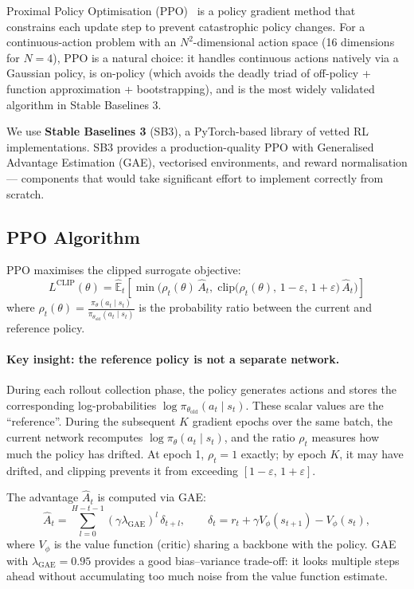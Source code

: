 \documentclass[11pt]{article}
\begin{document}
Proximal Policy Optimisation (PPO)~\cite{schulman2017ppo} is a policy gradient method that constrains each update step to prevent catastrophic policy changes. For a continuous-action problem with an $N^2$-dimensional action space (16 dimensions for $N=4$), PPO is a natural choice: it handles continuous actions natively via a Gaussian policy, is on-policy (which avoids the deadly triad of off-policy + function approximation + bootstrapping), and is the most widely validated algorithm in Stable Baselines 3.

We use \textbf{Stable Baselines 3} (SB3), a PyTorch-based library of vetted RL implementations. SB3 provides a production-quality PPO with Generalised Advantage Estimation (GAE), vectorised environments, and reward normalisation — components that would take significant effort to implement correctly from scratch.

\subsection{PPO Algorithm}

PPO maximises the clipped surrogate objective:
\begin{equation}\label{eq:ppo}
    L^{\text{CLIP}}(\theta) = \hat{\mathbb{E}}_t \left[\min\!\Big(
        \rho_t(\theta)\,\hat{A}_t,\;
        \text{clip}\big(\rho_t(\theta),\, 1{-}\varepsilon,\, 1{+}\varepsilon\big)\,\hat{A}_t
    \Big)\right]
\end{equation}
where $\rho_t(\theta) = \frac{\pi_\theta(a_t \mid s_t)}{\pi_{\theta_{\text{old}}}(a_t \mid s_t)}$ is the probability ratio between the current and reference policy.

\paragraph{Key insight: the reference policy is not a separate network.} During each rollout collection phase, the policy generates actions and stores the corresponding log-probabilities $\log \pi_{\theta_{\text{old}}}(a_t \mid s_t)$. These scalar values are the ``reference''. During the subsequent $K$ gradient epochs over the same batch, the current network recomputes $\log \pi_\theta(a_t \mid s_t)$, and the ratio $\rho_t$ measures how much the policy has drifted. At epoch 1, $\rho_t = 1$ exactly; by epoch $K$, it may have drifted, and clipping prevents it from exceeding $[1{-}\varepsilon,\, 1{+}\varepsilon]$.

The advantage $\hat{A}_t$ is computed via GAE:
\begin{equation}
    \hat{A}_t = \sum_{l=0}^{H-t-1} (\gamma \lambda_{\text{GAE}})^l \,\delta_{t+l}, \qquad
    \delta_t = r_t + \gamma V_\phi(s_{t+1}) - V_\phi(s_t),
\end{equation}
where $V_\phi$ is the value function (critic) sharing a backbone with the policy. GAE with $\lambda_{\text{GAE}} = 0.95$ provides a good bias--variance trade-off: it looks multiple steps ahead without accumulating too much noise from the value function estimate.
\end{document}
